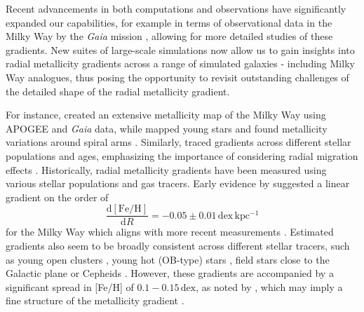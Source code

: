 \documentclass[fleqn,usenatbib]{mnras}
\begin{document}
Recent advancements in both computations and observations have significantly expanded our capabilities, for example in terms of observational data in the Milky Way by the \textit{Gaia} mission \citep{Gaia-Collaboration2016}, allowing for more detailed studies of these gradients. New suites of large-scale simulations now allow us to gain insights into radial metallicity gradients across a range of simulated galaxies - including Milky Way analogues, thus posing the opportunity to revisit outstanding challenges of the detailed shape of the radial metallicity gradient.

For instance, \citet{Hogg2019} created an extensive metallicity map of the Milky Way using APOGEE and \textit{Gaia} data, while \citet{Poggio2022} mapped young stars and found metallicity variations around spiral arms \citep[see also][]{Zari2018, Zari2021, Poggio2021, Hackshaw2024}. Similarly, \citet[][among others]{Imig2023} traced gradients across different stellar populations and ages, emphasizing the importance of considering radial migration effects \citep{Binney2008, Frankel2018, Frankel2020}. Historically, radial metallicity gradients have been measured using various stellar populations and gas tracers. Early evidence by \citet{Janes1979} suggested a linear gradient on the order of
\begin{equation}
\frac{\mathrm{d{[Fe/H]}}}{\mathrm{d}R} = -0.05 \pm 0.01\,\mathrm{dex\,kpc^{-1}}
\end{equation}
for the Milky Way which aligns with more recent measurements \citep{Anders2017, Hayden2015}. Estimated gradients also seem to be broadly consistent across different stellar tracers, such as young open clusters \citep[e.g.][]{Yong2012, Cunha2016, Magrini2017, Casamiquela2019, Donor2020, Spina2021,Myers2022}, young hot (OB-type) stars \citep{Zari2018, Zari2021, Poggio2021, Poggio2022}, field stars close to the Galactic plane \citep[e.g.][]{Bergemann2014} or Cepheids \citep{Andrievsky2002, Andrievsky2002b, Lemasle2007, Lemasle2013}. However, these gradients are accompanied by a significant spread in [Fe/H] of $0.1-0.15\,\mathrm{dex}$, as noted by \citet{Twarog1980}, which may imply a fine structure of the metallicity gradient \citep[see][]{Genovali2014}.
\end{document}
